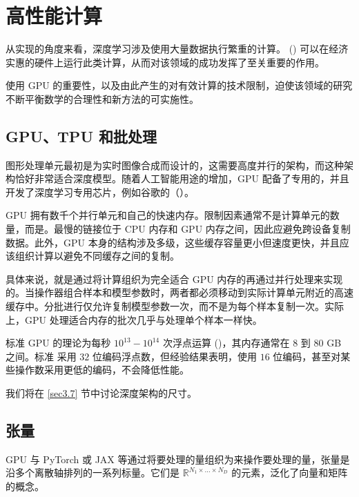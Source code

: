\chapter{高性能计算}

从实现的角度来看，深度学习涉及使用大量数据执行繁重的计算。 () 可以在经济实惠的硬件上运行此类计算，从而对该领域的成功发挥了至关重要的作用。

使用 GPU 的重要性，以及由此产生的对有效计算的技术限制，迫使该领域的研究不断平衡数学的合理性和新方法的可实施性。

\section{GPU、TPU 和批处理}

图形处理单元最初是为实时图像合成而设计的，这需要高度并行的架构，而这种架构恰好非常适合深度模型。随着人工智能用途的增加，GPU 配备了专用的，并且开发了深度学习专用芯片，例如谷歌的（）。

GPU 拥有数千个并行单元和自己的快速内存。限制因素通常不是计算单元的数量，而是。最慢的链接位于 CPU 内存和 GPU 内存之间，因此应避免跨设备复制数据。此外，GPU 本身的结构涉及多级，这些缓存容量更小但速度更快，并且应该组织计算以避免不同缓存之间的复制。

具体来说，就是通过将计算组织为完全适合 GPU 内存的再通过并行处理来实现的。当操作器组合样本和模型参数时，两者都必须移动到实际计算单元附近的高速缓存中。分批进行仅允许复制模型参数一次，而不是为每个样本复制一次。实际上，GPU 处理适合内存的批次几乎与处理单个样本一样快。

标准 GPU 的理论为每秒 $10^{13}-10^{14}$ 次浮点运算 ()，其内存通常在 $8$ 到 $80$ GB 之间。标准  采用 $32$ 位编码浮点数，但经验结果表明，使用 $16$ 位编码，甚至对某些操作数采用更低的编码，不会降低性能。

我们将在 \ref{sec3.7} 节中讨论深度架构的尺寸。

\section{张量}

GPU 与 PyTorch 或 JAX 等通过将要处理的量组织为来操作要处理的量，张量是沿多个离散轴排列的一系列标量。它们是 $\mathbb{R}^{N_1 \times \dots \times N_D}$ 的元素，泛化了向量和矩阵的概念。

